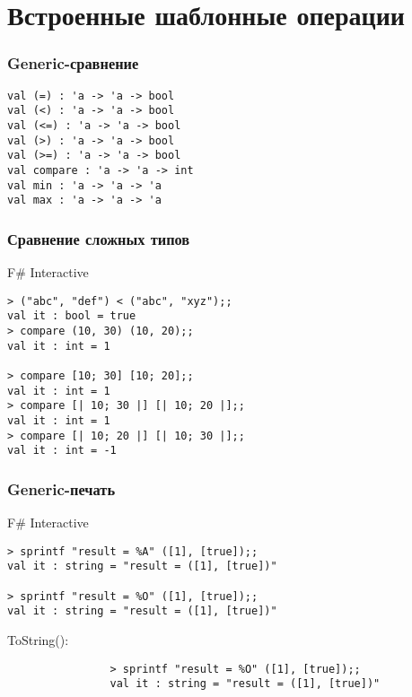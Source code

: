 \documentclass{../../slides-style}
\begin{document}
    \section{Встроенные шаблонные операции}

    \begin{frame}[fragile]
        \frametitle{Generic-сравнение}
        \begin{verbatim}
val (=) : 'a -> 'a -> bool
val (<) : 'a -> 'a -> bool
val (<=) : 'a -> 'a -> bool
val (>) : 'a -> 'a -> bool
val (>=) : 'a -> 'a -> bool
val compare : 'a -> 'a -> int
val min : 'a -> 'a -> 'a
val max : 'a -> 'a -> 'a
        \end{verbatim}
    \end{frame}

    \begin{frame}[fragile]
        \frametitle{Сравнение сложных типов}
        \begin{alertblock}{F\# Interactive}
            \begin{verbatim}
> ("abc", "def") < ("abc", "xyz");;
val it : bool = true
> compare (10, 30) (10, 20);;
val it : int = 1

> compare [10; 30] [10; 20];;
val it : int = 1
> compare [| 10; 30 |] [| 10; 20 |];;
val it : int = 1
> compare [| 10; 20 |] [| 10; 30 |];;
val it : int = -1
            \end{verbatim}
        \end{alertblock}
    \end{frame}

    \begin{frame}[fragile]
        \frametitle{Generic-печать}
        \begin{alertblock}{F\# Interactive}
            \begin{verbatim}
> sprintf "result = %A" ([1], [true]);;
val it : string = "result = ([1], [true])"

> sprintf "result = %O" ([1], [true]);;
val it : string = "result = ([1], [true])"
            \end{verbatim}
            \vspace{3mm}
            ToString():
            \begin{verbatim}
                > sprintf "result = %O" ([1], [true]);;
                val it : string = "result = ([1], [true])"
            \end{verbatim}
        \end{alertblock}
    \end{frame}
\end{document}
